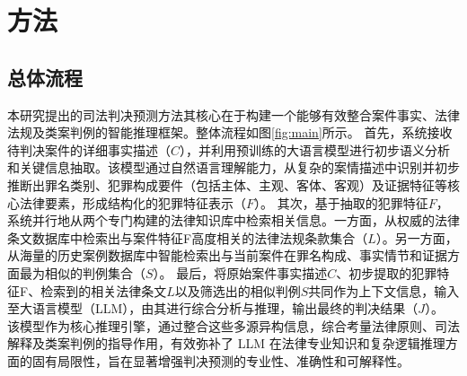 

\section{\heiti 方法}
\subsection{\heiti 总体流程}

本研究提出的司法判决预测方法其核心在于构建一个能够有效整合案件事实、法律法规及类案判例的智能推理框架。整体流程如图\ref{fig:main}所示。
首先，系统接收待判决案件的详细事实描述（$C$），并利用预训练的大语言模型进行初步语义分析和关键信息抽取。该模型通过自然语言理解能力，从复杂的案情描述中识别并初步推断出罪名类别、犯罪构成要件（包括主体、主观、客体、客观）及证据特征等核心法律要素，形成结构化的犯罪特征表示（$F$）。
其次，基于抽取的犯罪特征$F$，系统并行地从两个专门构建的法律知识库中检索相关信息。一方面，从权威的法律条文数据库中检索出与案件特征F高度相关的法律法规条款集合（$L$）。另一方面，从海量的历史案例数据库中智能检索出与当前案件在罪名构成、事实情节和证据方面最为相似的判例集合（$S$）。
最后，将原始案件事实描述$C$、初步提取的犯罪特征F、检索到的相关法律条文$L$以及筛选出的相似判例$S$共同作为上下文信息，输入至大语言模型（LLM），由其进行综合分析与推理，输出最终的判决结果（$J$）。
该模型作为核心推理引擎，通过整合这些多源异构信息，综合考量法律原则、司法解释及类案判例的指导作用，有效弥补了 LLM 在法律专业知识和复杂逻辑推理方面的固有局限性，旨在显著增强判决预测的专业性、准确性和可解释性。

